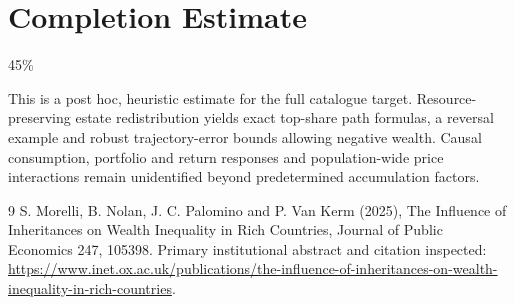 \documentclass[11pt]{article}
\begin{document}
\section{Completion Estimate}
45\%

This is a post hoc, heuristic estimate for the full catalogue target.
Resource-preserving estate redistribution yields exact top-share path formulas, a reversal example and robust trajectory-error bounds allowing negative wealth. Causal consumption, portfolio and return responses and population-wide price interactions remain unidentified beyond predetermined accumulation factors.

\begin{thebibliography}{9}
 S. Morelli, B. Nolan, J. C. Palomino and P. Van Kerm (2025), The Influence of Inheritances on Wealth Inequality in Rich Countries, Journal of Public Economics 247, 105398. Primary institutional abstract and citation inspected:
\url{https://www.inet.ox.ac.uk/publications/the-influence-of-inheritances-on-wealth-inequality-in-rich-countries}.
\end{thebibliography}
\end{document}
